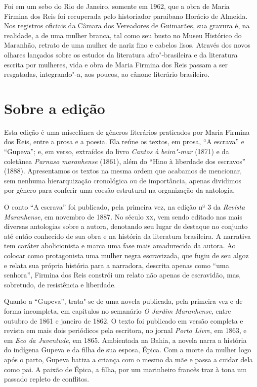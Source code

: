 Foi em um sebo do Rio de Janeiro, somente em 1962, que a obra de Maria
Firmina dos Reis foi recuperada pelo historiador paraibano Horácio de
Almeida. Nos registros oficiais da Câmara dos Vereadores de Guimarães,
sua gravura é, na realidade, a de uma mulher branca, tal como seu busto
no Museu Histórico do Maranhão, retrato de uma mulher de nariz fino e
cabelos lisos. Através dos novos olhares lançados sobre os estudos da
literatura afro"-brasileira e da literatura escrita por mulheres, vida e
obra de Maria Firmina dos Reis passam a ser resgatadas, integrando"-a,
aos poucos, ao cânone literário brasileiro.

\chapter{Sobre a edição}

Esta edição é uma miscelânea de gêneros literários praticados por Maria
Firmina dos
Reis, entre a prosa e a poesia. Ela reúne os textos, em prosa, ``A
escrava'' e ``Gupeva''; e, em verso, extraídos do livro \emph{Cantos à
beira"-mar} (1871) e da coletânea \emph{Parnaso maranhense} (1861), além
do ``Hino à liberdade dos escravos'' (1888). Apresentamos os textos na
mesma ordem que acabamos de mencionar, sem nenhuma hierarquização
cronológica ou de importância, apenas dividimos por gênero para conferir
uma coesão estrutural na organização da antologia.

O conto ``A escrava'' foi publicado, pela primeira vez, na edição nº 3
da \emph{Revista Maranhense}, em novembro de 1887. No século \textsc{xx}, vem
sendo editado nas mais diversas antologias sobre a autora, denotando seu
lugar de destaque no conjunto até então conhecido de sua obra e na
história da literatura brasileira. A narrativa tem caráter abolicionista
e marca uma fase mais amadurecida da autora. Ao colocar como
protagonista uma mulher negra escravizada, que fugiu de seu algoz e
relata sua própria história para a narradora, descrita apenas como ``uma
senhora'', Firmina dos Reis constrói um relato não apenas de escravidão,
mas, sobretudo, de resistência e liberdade.

Quanto a ``Gupeva'', trata"-se de uma novela publicada, pela primeira vez
e de forma incompleta, em capítulos no semanário \emph{O Jardim
Maranhense}, entre outubro de 1861 e janeiro de 1862. O texto foi
publicado em versão completa e revista em mais dois periódicos pela
escritora, no jornal \emph{Porto Livre}, em 1863, e em \emph{Eco da
Juventude}, em 1865. Ambientada na Bahia, a novela narra a história do
indígena Gupeva e da filha de sua esposa, Épica. Com a morte da mulher
logo após o parto, Gupeva batiza a criança com o mesmo da mãe e passa a
cuidar dela como pai. A paixão de Épica, a filha, por um marinheiro
francês traz à tona um passado repleto de conflitos.

